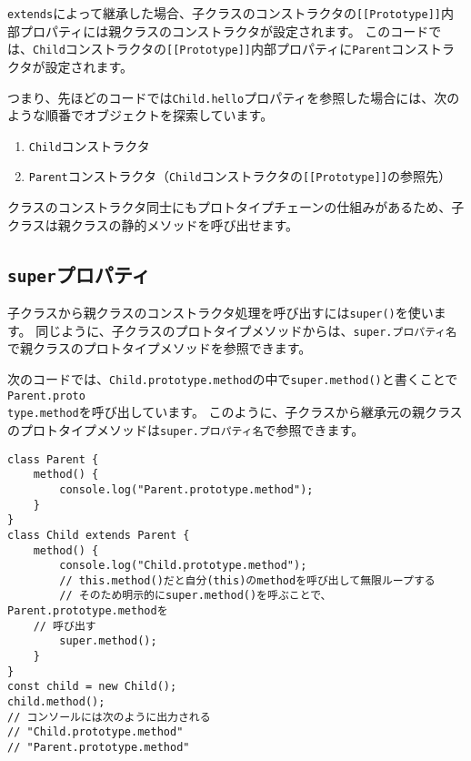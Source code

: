 \texttt{extends}によって継承した場合、子クラスのコンストラクタの\texttt{[[Prototype]]}内部プロパティには親クラスのコンストラクタが設定されます。
このコードでは、\texttt{Child}コンストラクタの\texttt{[[Prototype]]}内部プロパティに\texttt{Parent}コンストラクタが設定されます。

つまり、先ほどのコードでは\texttt{Child.hello}プロパティを参照した場合には、次のような順番でオブジェクトを探索しています。

\begin{enumerate}
\def\labelenumi{\arabic{enumi}.}
\item
  \texttt{Child}コンストラクタ
\item
  \texttt{Parent}コンストラクタ（\texttt{Child}コンストラクタの\texttt{[[Prototype]]}の参照先）
\end{enumerate}

クラスのコンストラクタ同士にもプロトタイプチェーンの仕組みがあるため、子クラスは親クラスの静的メソッドを呼び出せます。

\hypertarget{super-property}{%
\subsection{\texorpdfstring{\texttt{super}プロパティ}{superプロパティ}}\label{super-property}}

子クラスから親クラスのコンストラクタ処理を呼び出すには\texttt{super()}を使います。
同じように、子クラスのプロトタイプメソッドからは、\texttt{super.\hbox{}プロパティ名}で親クラスのプロトタイプメソッドを参照できます。

次のコードでは、\texttt{Child.prototype.method}の中で\texttt{super.method()}と書くことで\texttt{Parent.proto\\type.method}を呼び出しています。
このように、子クラスから継承元の親クラスのプロトタイプメソッドは\texttt{super.\hbox{}プロパティ名}で参照できます。

\begin{lstlisting}
class Parent {
    method() {
        console.log("Parent.prototype.method");
    }
}
class Child extends Parent {
    method() {
        console.log("Child.prototype.method");
        // this.method()だと自分(this)のmethodを呼び出して無限ループする
        // そのため明示的にsuper.method()を呼ぶことで、Parent.prototype.methodを
	// 呼び出す
        super.method();
    }
}
const child = new Child();
child.method(); 
// コンソールには次のように出力される
// "Child.prototype.method"
// "Parent.prototype.method"
\end{lstlisting}

